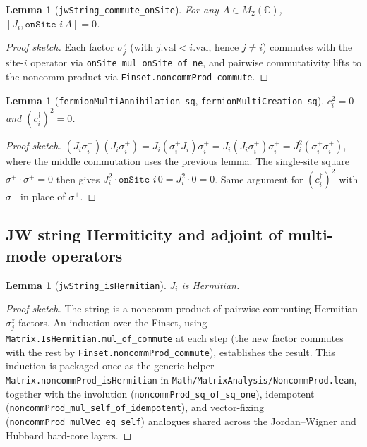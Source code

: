 \documentclass[a4paper,11pt]{article}
\newtheorem{lemma}[theorem]{Lemma}
\begin{document}
\begin{lemma}[\texttt{jwString\_commute\_onSite}]
For any $A \in M_2(\mathbb{C})$, $[J_i, \texttt{onSite } i\, A] = 0$.
\end{lemma}

\begin{proof}[Proof sketch]
Each factor $\sigma^z_j$ (with $j.\mathrm{val} < i.\mathrm{val}$,
hence $j \neq i$) commutes with the site-$i$ operator via
\texttt{onSite\_mul\_onSite\_of\_ne}, and pairwise commutativity lifts
to the noncomm-product via \texttt{Finset.noncommProd\_commute}.
\end{proof}

\begin{lemma}[\texttt{fermionMultiAnnihilation\_sq}, \texttt{fermionMultiCreation\_sq}]
$c_i^2 = 0$ and $(c_i^\dagger)^2 = 0$.
\end{lemma}

\begin{proof}[Proof sketch]
$(J_i \sigma^+_i)(J_i \sigma^+_i)
 = J_i (\sigma^+_i J_i) \sigma^+_i
 = J_i (J_i \sigma^+_i) \sigma^+_i
 = J_i^2 (\sigma^+_i \sigma^+_i)$,
where the middle commutation uses the previous lemma.  The single-site
square $\sigma^+ \cdot \sigma^+ = 0$ then gives
$J_i^2 \cdot \texttt{onSite } i\, 0 = J_i^2 \cdot 0 = 0$.  Same
argument for $(c_i^\dagger)^2$ with $\sigma^-$ in place of $\sigma^+$.
\end{proof}

\subsection{JW string Hermiticity and adjoint of multi-mode operators}

\begin{lemma}[\texttt{jwString\_isHermitian}]
$J_i$ is Hermitian.
\end{lemma}

\begin{proof}[Proof sketch]
The string is a noncomm-product of pairwise-commuting Hermitian
$\sigma^z_j$ factors.  An induction over the Finset, using
\texttt{Matrix.IsHermitian.mul\_of\_commute} at each step (the new
factor commutes with the rest by
\texttt{Finset.noncommProd\_commute}), establishes the result.  This
induction is packaged once as the generic helper
\texttt{Matrix.noncommProd\_isHermitian} in
\texttt{Math/MatrixAnalysis/NoncommProd.lean}, together with the
involution (\texttt{noncommProd\_sq\_of\_sq\_one}), idempotent
(\texttt{noncommProd\_mul\_self\_of\_idempotent}), and vector-fixing
(\texttt{noncommProd\_mulVec\_eq\_self}) analogues shared across the
Jordan--Wigner and Hubbard hard-core layers.
\end{proof}
\end{document}

